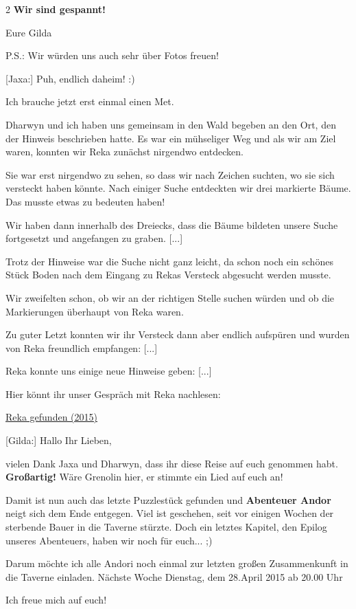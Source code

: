 \documentclass[10pt, a4paper, oneside]{book}
\begin{document}
\begin{multicols}{2}
\textbf{Wir sind gespannt!}


Eure Gilda

P.S.: Wir würden uns auch sehr über Fotos freuen!

[Jaxa:] Puh, endlich daheim! :)

Ich brauche jetzt erst einmal einen Met.

Dharwyn und ich haben uns gemeinsam in den Wald begeben an den Ort, den der Hinweis beschrieben hatte. Es war ein mühseliger Weg und als wir am Ziel waren, konnten wir Reka zunächst nirgendwo entdecken.

Sie war erst nirgendwo zu sehen, so dass wir nach Zeichen suchten, wo sie sich versteckt haben könnte. Nach einiger Suche entdeckten wir drei markierte Bäume. Das musste etwas zu bedeuten haben!

Wir haben dann innerhalb des Dreiecks, dass die Bäume bildeten unsere Suche fortgesetzt und angefangen zu graben. [...] 

Trotz der Hinweise war die Suche nicht ganz leicht, da schon noch ein schönes Stück Boden nach dem Eingang zu Rekas Versteck abgesucht werden musste.

Wir zweifelten schon, ob wir an der richtigen Stelle suchen würden und ob die Markierungen überhaupt von Reka waren.

Zu guter Letzt konnten wir ihr Versteck dann aber endlich aufspüren und wurden von Reka freundlich empfangen: [...]

Reka konnte uns einige neue Hinweise geben: [...]

Hier könnt ihr unser Gespräch mit Reka nachlesen:

\hyperref[storytext-2015-reka-gefunden]{Reka gefunden (2015)}

[Gilda:] Hallo Ihr Lieben,

vielen Dank Jaxa und Dharwyn, dass ihr diese Reise auf euch genommen habt. \textbf{Großartig!} Wäre Grenolin hier, er stimmte ein Lied auf euch an!

Damit ist nun auch das letzte Puzzlestück gefunden und \textbf{Abenteuer Andor} neigt sich dem Ende entgegen. Viel ist geschehen, seit vor einigen Wochen der sterbende Bauer in die Taverne stürzte. Doch ein letztes Kapitel, den Epilog unseres Abenteuers, haben wir noch für euch... ;)

Darum möchte ich alle Andori noch einmal zur letzten großen Zusammenkunft in die Taverne einladen. Nächste Woche Dienstag, dem 28.April 2015 ab 20.00 Uhr


Ich freue mich auf euch!


\end{multicols}
\end{document}
